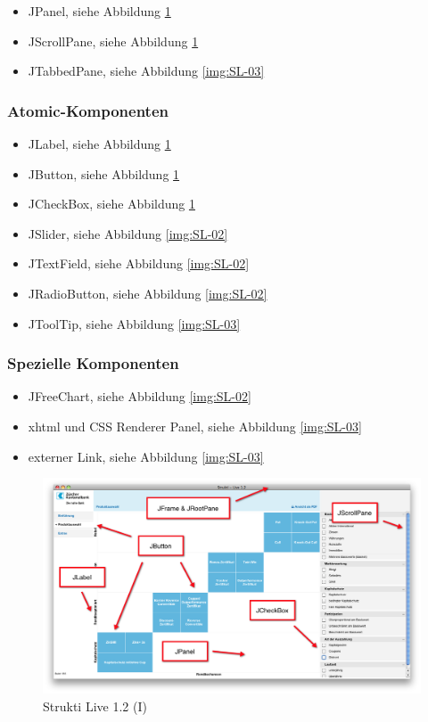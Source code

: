   \begin{itemize}
  \item JPanel, siehe Abbildung \ref{img:SL-01}
  \item JScrollPane, siehe Abbildung \ref{img:SL-01}
  \item JTabbedPane, siehe Abbildung \ref{img:SL-03}
  \end{itemize}
  
  \subsubsection{Atomic-Komponenten}
  
  \begin{itemize}
  \item JLabel, siehe Abbildung \ref{img:SL-01}
  \item JButton, siehe Abbildung \ref{img:SL-01}
  \item JCheckBox, siehe Abbildung \ref{img:SL-01}
  \item JSlider, siehe Abbildung \ref{img:SL-02}
  \item JTextField, siehe Abbildung \ref{img:SL-02}
  \item JRadioButton, siehe Abbildung \ref{img:SL-02}
  \item JToolTip, siehe Abbildung \ref{img:SL-03}
  \end{itemize}
  
  \subsubsection{Spezielle Komponenten}
  
  \begin{itemize}
  \item JFreeChart, siehe Abbildung \ref{img:SL-02}
  \item xhtml und CSS Renderer Panel, siehe Abbildung \ref{img:SL-03}
  \item externer Link, siehe Abbildung \ref{img:SL-03}
  \end{itemize}
  
  \begin{figure}[htb]
    \begin{center}
      \includegraphics[width=\textwidth]{./image/SL/SL-01.png}
      \caption{Strukti Live 1.2 (I)}
      \label{img:SL-01}
    \end{center}
  \end{figure}
  
